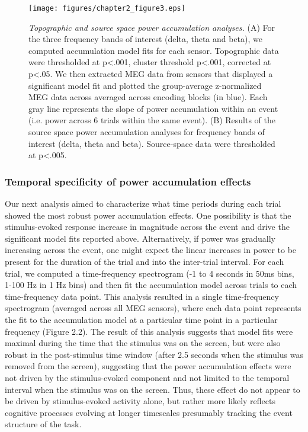 \begin{figure}
  \centering
  \texttt{[image: figures/chapter2\_figure3.eps]}
  \caption[Topographic and source space power accumulation analyses]{\textit{Topographic and source space power accumulation analyses.} (A) For the three frequency bands of interest (delta, theta and beta), we computed accumulation model fits for each sensor.  Topographic data were thresholded at p<.001, cluster threshold p<.001, corrected at p<.05.  We then extracted MEG data from sensors that displayed a significant model fit and plotted the group-average z-normalized MEG data across averaged across encoding blocks (in blue).  Each gray line represents the slope of power accumulation within an event (i.e. power across 6 trials within the same event). (B) Results of the source space power accumulation analyses for frequency bands of interest (delta, theta and beta).  Source-space data were thresholded at p<.005.}
  \label{chapter2_figure3}
\end{figure}

\subsubsection{Temporal specificity of power accumulation
effects}\label{temporal-specificity-of-power-accumulation-effects}

Our next analysis aimed to characterize what time periods during each
trial showed the most robust power accumulation effects. One possibility
is that the stimulus-evoked response increase in magnitude across the
event and drive the significant model fits reported above.
Alternatively, if power was gradually increasing across the event, one
might expect the linear increases in power to be present for the
duration of the trial and into the inter-trial interval. For each trial,
we computed a time-frequency spectrogram (-1 to 4 seconds in 50ms bins,
1-100 Hz in 1 Hz bins) and then fit the accumulation model across trials
to each time-frequency data point. This analysis resulted in a single
time-frequency spectrogram (averaged across all MEG sensors), where each
data point represents the fit to the accumulation model at a particular
time point in a particular frequency (Figure 2.2). The result of this
analysis suggests that model fits were maximal during the time that the
stimulus was on the screen, but were also robust in the post-stimulus
time window (after 2.5 seconds when the stimulus was removed from the
screen), suggesting that the power accumulation effects were not driven
by the stimulus-evoked component and not limited to the temporal
interval when the stimulus was on the screen. Thus, these effect do not
appear to be driven by stimulus-evoked activity alone, but rather more
likely reflects cognitive processes evolving at longer timescales
presumably tracking the event structure of the task.

